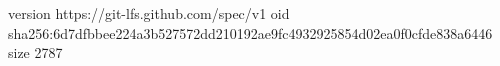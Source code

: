 version https://git-lfs.github.com/spec/v1
oid sha256:6d7dfbbee224a3b527572dd210192ae9fc4932925854d02ea0f0cfde838a6446
size 2787
